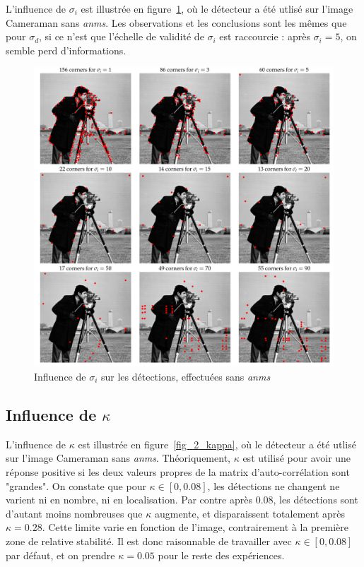 \documentclass[12pt,a4paper,onecolumn]{article}
\begin{document}
L'influence de \(\sigma_i\) est illustrée en figure~\ref{fig_2_sigma_i}, où le détecteur a été utlisé sur l'image Cameraman sans \textit{anms}. Les observations et les conclusions sont les mêmes que pour \(\sigma_d\), si ce n'est que l'échelle de validité de \(\sigma_i\) est raccourcie : après \(\sigma_i = 5\), on semble perd d'informations.

\begin{figure}[H]
	\centering
	\includegraphics[width = 1.0\textwidth]{2_cameraman_si}
	\caption{Influence de \(\sigma_i\) sur les détections, effectuées sans \textit{anms}}
	\label{fig_2_sigma_i}
\end{figure}

\subsection{Influence de \(\kappa\)}

L'influence de \(\kappa\) est illustrée en figure~\ref{fig_2_kappa}, où le détecteur a été utlisé sur l'image Cameraman sans \textit{anms}. Théoriquement, \(\kappa\) est utilisé pour avoir une réponse positive si les deux valeurs propres de la matrix d'auto-corrélation sont "grandes". On constate que pour \(\kappa \in [0, 0.08]\), les détections ne changent ne varient ni en nombre, ni en localisation. Par contre après 0.08, les détections sont d'autant moins nombreuses que \(\kappa\) augmente, et disparaissent totalement après \(\kappa = 0.28\). Cette limite varie en fonction de l'image, contrairement à la première zone de relative stabilité. Il est donc raisonnable de travailler avec \(\kappa \in [0, 0.08]\) par défaut, et on prendre \(\kappa = 0.05 \) pour le reste des expériences.
\end{document}
